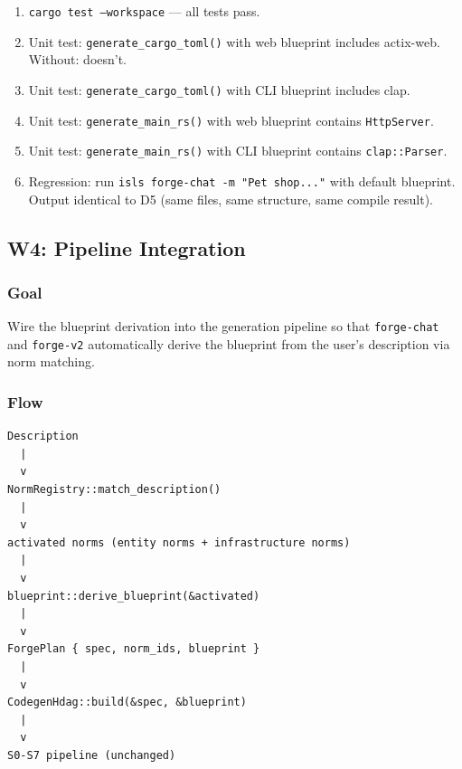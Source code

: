 \documentclass[11pt,a4paper]{article}
\begin{document}
\begin{enumerate}[nosep]
\item \texttt{cargo test --workspace} --- all tests pass.
\item Unit test: \texttt{generate\_cargo\_toml()} with web blueprint 
      includes actix-web. Without: doesn't.
\item Unit test: \texttt{generate\_cargo\_toml()} with CLI blueprint 
      includes clap.
\item Unit test: \texttt{generate\_main\_rs()} with web blueprint 
      contains \texttt{HttpServer}.
\item Unit test: \texttt{generate\_main\_rs()} with CLI blueprint 
      contains \texttt{clap::Parser}.
\item Regression: run \texttt{isls forge-chat -m "Pet shop..."} with 
      default blueprint. Output identical to D5 (same files, same 
      structure, same compile result).
\end{enumerate}


\subsection{W4: Pipeline Integration}
\label{sec:w4}

\subsubsection{Goal}

Wire the blueprint derivation into the generation pipeline so that 
\texttt{forge-chat} and \texttt{forge-v2} automatically derive the 
blueprint from the user's description via norm matching.

\subsubsection{Flow}

\begin{lstlisting}[style=bash]
Description
  |
  v
NormRegistry::match_description()
  |
  v
activated norms (entity norms + infrastructure norms)
  |
  v
blueprint::derive_blueprint(&activated)
  |
  v
ForgePlan { spec, norm_ids, blueprint }
  |
  v
CodegenHdag::build(&spec, &blueprint)
  |
  v
S0-S7 pipeline (unchanged)
\end{lstlisting}
\end{document}
